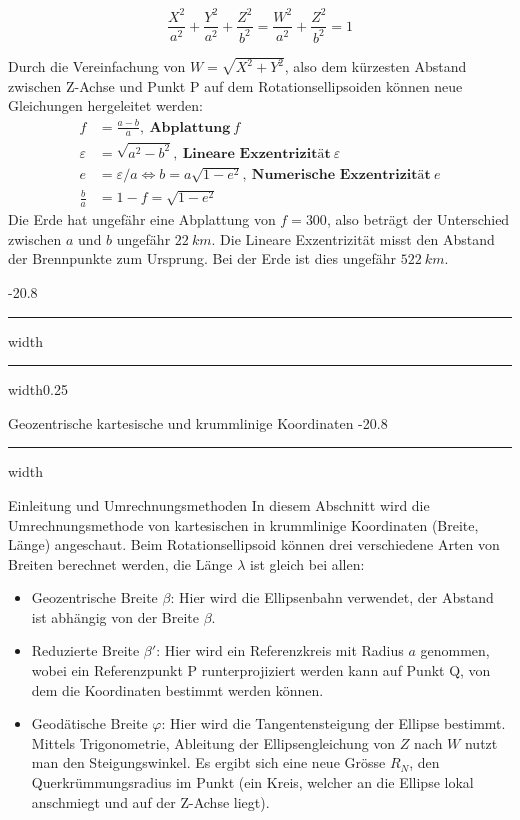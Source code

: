 \documentclass[8pt, landscape, fleqn]{scrartcl}
\makeatletter
\renewcommand{\subsection}{\@startsection{subsection}{1}{0mm}%
{-2\baselineskip}{0.8\baselineskip}%
{\hrule depth 0.2pt width\columnwidth\hrule depth0.75pt
width0.25\columnwidth\vspace*{1.2em}\large\bfseries\rmfamily}}
\renewcommand{\subsubsection}{\@startsection{subsubsection}{1}{0mm}%
{-2\baselineskip}{0.8\baselineskip}%
{\hrule depth 0.2pt width\columnwidth\vspace*{1.2em}\normalsize\bfseries\rmfamily}}
\makeatother
\begin{document}
\begin{multicols*}{3}
\begin{equation*}
    \frac{X^2}{a^2}+\frac{Y^2}{a^2} + \frac{Z^2}{b^2} = \frac{W^2}{a^2} + \frac{Z^2}{b^2}= 1
\end{equation*}

Durch die Vereinfachung von $W = \sqrt{X^2+Y^2}$, also dem kürzesten Abstand zwischen Z-Achse und Punkt P auf dem Rotationsellipsoiden können neue Gleichungen hergeleitet werden:
\begin{align*}
    f &= \frac{a-b}{a},~ \textbf{Abplattung}~f \\
    \varepsilon &= \sqrt{a^2-b^2},~\textbf{Lineare Exzentrizität}~\varepsilon \\
    e &= \varepsilon/a \Longleftrightarrow b=a \sqrt{1-e^2},~\textbf{Numerische Exzentrizität}~e \\
    \frac{b}{a}&=1-f = \sqrt{1-e^2}
\end{align*}
Die Erde hat ungefähr eine Abplattung von $f=300$, also beträgt der Unterschied zwischen $a$ und $b$ ungefähr $22~km$. Die Lineare Exzentrizität misst den Abstand der Brennpunkte zum Ursprung. Bei der Erde ist dies ungefähr $522~km$. 

\subsection{Geozentrische kartesische und krummlinige Koordinaten}
\subsubsection{Einleitung und Umrechnungsmethoden}
In diesem Abschnitt wird die Umrechnungsmethode von kartesischen in krummlinige Koordinaten (Breite, Länge) angeschaut. Beim Rotationsellipsoid können drei verschiedene Arten von Breiten berechnet werden, die Länge $\lambda$ ist gleich bei allen:
\begin{itemize}
    \item Geozentrische Breite $\beta$: Hier wird die Ellipsenbahn verwendet, der Abstand ist abhängig von der Breite $\beta$.
    \item Reduzierte Breite $\beta'$: Hier wird ein Referenzkreis mit Radius $a$ genommen, wobei ein Referenzpunkt P runterprojiziert werden kann auf Punkt Q, von dem die Koordinaten bestimmt werden können.
    \item Geodätische Breite $\varphi$: Hier wird die Tangentensteigung der Ellipse bestimmt. Mittels Trigonometrie, Ableitung der Ellipsengleichung von $Z$ nach $W$ nutzt man den Steigungswinkel. Es ergibt sich eine neue Grösse $R_N$, den Querkrümmungsradius im Punkt (ein Kreis, welcher an die Ellipse lokal anschmiegt und auf der Z-Achse liegt).
\end{itemize}


\end{multicols*}
\end{document}
